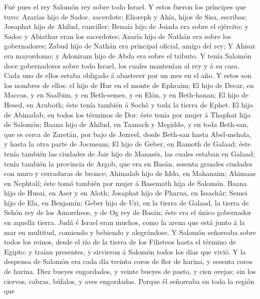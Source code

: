  Fué pues el rey Salomón rey sobre todo Israel. 
Y estos fueron los príncipes que tuvo: Azarías hijo de Sadoc, sacerdote;
 Elioreph y Ahía, hijos de Sisa, escribas; Josaphat hijo de
Ahilud, canciller;  Benaía hijo de Joiada era sobre el
ejército; y Sadoc y Abiathar eran los sacerdotes;  Azaría
hijo de Nathán era sobre los gobernadores; Zabud hijo de Nathán era
principal oficial, amigo del rey;  Y Ahisar era mayordomo; y
Adoniram hijo de Abda era sobre el tributo.  Y tenía Salomón
doce gobernadores sobre todo Israel, los cuales mantenían al rey y á su
casa. Cada uno de ellos estaba obligado á abastecer por un mes en el
año.  Y estos son los nombres de ellos: el hijo de Hur en el
monte de Ephraim;  El hijo de Decar, en Maccas, y en
Saalbim, y en Beth-semes, y en Elón, y en Beth-hanan;  El
hijo de Hesed, en Aruboth; éste tenía también á Sochô y toda la tierra
de Ephet.  El hijo de Abinadab, en todos los términos de
Dor: éste tenía por mujer á Thaphat hija de Salomón;  Baana
hijo de Ahilud, en Taanach y Megiddo, y en toda Beth-san, que es cerca
de Zaretán, por bajo de Jezreel, desde Beth-san hasta Abel-mehola, y
hasta la otra parte de Jocmeam;  El hijo de Geber, en
Ramoth de Galaad; éste tenía también las ciudades de Jair hijo de
Manasés, las cuales estaban en Galaad; tenía también la provincia de
Argob, que era en Basán, sesenta grandes ciudades con muro y cerraduras
de bronce;  Ahinadab hijo de Iddo, en Mahanaim;
 Ahimaas en Nephtalí; éste tomó también por mujer á
Basemath hija de Salomón.  Baana hijo de Husai, en Aser y
en Aloth;  Josaphat hijo de Pharua, en Issachâr;
 Semei hijo de Ela, en Benjamín;  Geber hijo
de Uri, en la tierra de Galaad, la tierra de Sehón rey de los Amorrheos,
y de Og rey de Basán; éste era el único gobernador en aquella tierra.
 Judá é Israel eran muchos, como la arena que está junto á
la mar en multitud, comiendo y bebiendo y alegrándose.  Y
Salomón señoreaba sobre todos los reinos, desde el río de la tierra de
los Filisteos hasta el término de Egipto: y traían presentes, y
sirvieron á Salomón todos los días que vivió.  Y la
despensa de Salomón era cada día treinta coros de flor de harina, y
sesenta coros de harina.  Diez bueyes engordados, y veinte
bueyes de pasto, y cien ovejas; sin los ciervos, cabras, búfalos, y aves
engordadas.  Porque él señoreaba en toda la región que
